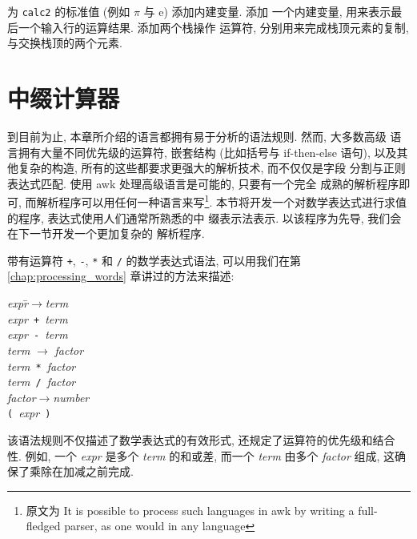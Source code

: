 \begin{exercise}
    \label{exer:calc2}
    为 \texttt{calc2} 的标准值 (例如 $\pi$ 与 $\mathrm{e}$) 添加内建变量.
    添加 一个内建变量, 用来表示最后一个输入行的运算结果. 添加两个栈操作
    运算符, 分别用来完成栈顶元素的复制, 与交换栈顶的两个元素.
\end{exercise}

\section{中缀计算器}
\label{sec:an_infix_calculator}

到目前为止, 本章所介绍的语言都拥有易于分析的语法规则. 然而, 大多数高级
语言拥有大量不同优先级的运算符, 嵌套结构 (比如括号与 if-then-else 语句),
以及其他复杂的构造, 所有的这些都要求更强大的解析技术, 而不仅仅是字段
分割与正则表达式匹配. 使用 awk 处理高级语言是可能的, 只要有一个完全
成熟的解析程序即可, 而解析程序可以用任何一种语言来写\footnote{原文为
    It is possible to process such languages in awk by
writing a full-fledged parser, as one would in any language}.
本节将开发一个对数学表达式进行求值的程序, 表达式使用人们通常所熟悉的中
缀表示法表示. 以该程序为先导, 我们会在下一节开发一个更加复杂的
解析程序.

带有运算符 \verb'+', \verb'-', \verb'*' 和 \verb'/' 的数学表达式语法,
可以用我们在第 \ref{chap:processing_words} 章讲过的方法来描述:
\begin{tabbing}
\indent\textit{expr}\hspace{2em}\=$\to$\hspace{2em}\=\textit{term} \\
\indent\> \> \textit{expr}\ \verb'+'\ \textit{term} \\
\indent\> \> \textit{expr}\ \verb'-'\ \textit{term} \\
\indent\textit{term} \> $\to$ \> \textit{factor} \\
\indent\> \> \textit{term}\ \verb'*'\ \textit{factor} \\
\indent\> \> \textit{term}\ \verb'/'\ \textit{factor} \\
\indent\textit{factor}\>$\to$\>\textit{number} \\
\indent\> \> \verb'('\ \textit{expr}\ \verb')'
\end{tabbing}

该语法规则不仅描述了数学表达式的有效形式, 还规定了运算符的优先级和结合
性. 例如, 一个 \textit{expr} 是多个 \textit{term} 的和或差, 而一个 
\textit{term} 由多个 \textit{factor} 组成, 这确保了乘除在加减之前完成.

